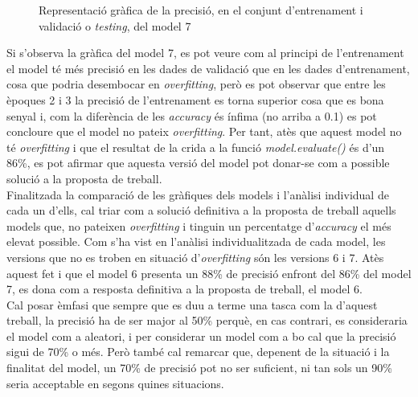 \documentclass[a4paper,12pt]{article}
\begin{document}
\begin{figure}[H]
    \centering
    \caption{Representació gràfica de la precisió, en el conjunt d'entrenament i validació o \textit{testing}, del model 7}
    \label{fig:model7}
\end{figure}
Si s'observa la gràfica del model 7, es pot veure com al principi de l'entrenament el model té més precisió en les dades de validació que en les dades d'entrenament, cosa que podria desembocar en \textit{overfitting}, però es pot observar que entre les èpoques 2 i 3 la precisió de l'entrenament es torna superior cosa que es bona senyal i, com la diferència de les \textit{accuracy} és ínfima (no arriba a 0.1) es pot concloure que el model no pateix \textit{overfitting}. Per tant, atès que aquest model no té \textit{overfitting} i que el resultat de la crida a la funció \textit{model.evaluate()} és d'un 86\%, es pot afirmar que aquesta versió del model pot donar-se com a possible solució a la proposta de treball.\\
Finalitzada la comparació de les gràfiques dels models i l'anàlisi individual de cada un d'ells, cal triar com a solució definitiva a la proposta de treball aquells models que, no pateixen \textit{overfitting} i tinguin un percentatge d'\textit{accuracy} el més elevat possible. Com s'ha vist en l'anàlisi individualitzada de cada model, les versions que no es troben en situació d'\textit{overfitting} són les versions 6 i 7. Atès aquest fet i que el model 6 presenta un 88\% de precisió enfront del 86\% del model 7, es dona com a resposta definitiva a la proposta de treball, el model 6.\\
Cal posar èmfasi que sempre que es duu a terme una tasca com la d'aquest treball, la precisió ha de ser major al 50\% perquè, en cas contrari, es consideraria el model com a aleatori, i per considerar un model com a bo cal que la precisió sigui de 70\% o més. Però també cal remarcar que, depenent de la situació i la finalitat del model, un 70\% de precisió pot no ser suficient, ni tan sols un 90\% seria acceptable en segons quines situacions.
\end{document}
